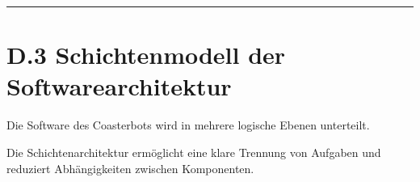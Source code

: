 \documentclass[
  a4paper,
  12pt,
  DIV=12,        %
  parskip=half,  %
  headings=small %
]{scrartcl}
\theoremstyle{definition}
\theoremstyle{definition}
\begin{document}

\begin{center}\rule{0.5\linewidth}{0.5pt}\end{center}

\section{D.3 Schichtenmodell der
Softwarearchitektur}\label{d.3-schichtenmodell-der-softwarearchitektur}

Die Software des Coasterbots wird in mehrere logische Ebenen unterteilt.

Die Schichtenarchitektur ermöglicht eine klare Trennung von Aufgaben und
reduziert Abhängigkeiten zwischen Komponenten.
\end{document}
